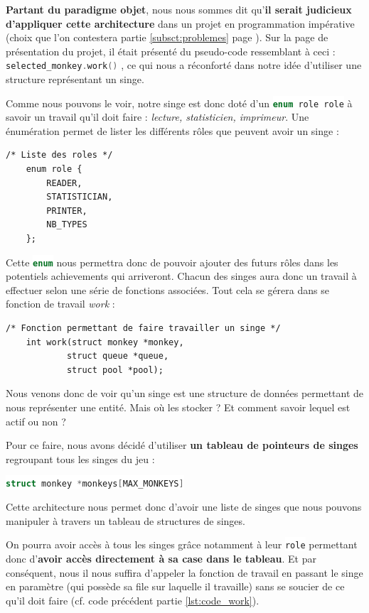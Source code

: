 \documentclass{article}
\newcommand{\inlinecode}[2]{\colorbox{white}{\lstinline[language=#1]$#2$}}
\begin{document}
\textbf{Partant du paradigme objet}, nous nous sommes dit qu'\textbf{il serait judicieux d'appliquer cette architecture} dans un projet en programmation impérative (choix que l'on contestera partie \ref{subsct:problemes} page \pageref{subsct:problemes}). Sur la page de présentation du projet, il était présenté du pseudo-code ressemblant à ceci : \inlinecode{C++}{selected_monkey.work()} \label{lst:work_method_poo}, ce qui nous a réconforté dans notre idée d'utiliser une structure représentant un singe.

Comme nous pouvons le voir, notre singe est donc doté d'un \inlinecode{C}{enum role role} à savoir un travail qu'il doit faire : \textit{lecture, statisticien, imprimeur}. Une énumération permet de lister les différents rôles que peuvent avoir un singe :
\begin{lstlisting}
/* Liste des roles */
    enum role {
        READER,
        STATISTICIAN,
        PRINTER,
        NB_TYPES
    }; 
\end{lstlisting}
\label{lst:enum_role}

Cette \inlinecode{C}{enum} nous permettra donc de pouvoir ajouter des futurs rôles dans les potentiels achievements qui arriveront. Chacun des singes aura donc un travail à effectuer selon une série de fonctions associées. Tout cela se gérera dans se fonction de travail \textit{work} :
\begin{lstlisting}
/* Fonction permettant de faire travailler un singe */
    int work(struct monkey *monkey,
            struct queue *queue,
            struct pool *pool);
\end{lstlisting}
\label{lst:code_work}

Nous venons donc de voir qu'un singe est une structure de données permettant de nous représenter une entité. Mais où les stocker ? Et comment savoir lequel est actif ou non ?

Pour ce faire, nous avons décidé d'utiliser \textbf{un tableau de pointeurs de singes} regroupant tous les singes du jeu :

\inlinecode{C}{struct monkey *monkeys[MAX_MONKEYS]}

Cette architecture nous permet donc d'avoir une liste de singes que nous pouvons manipuler à travers un tableau de structures de singes.

On pourra avoir accès à tous les singes grâce notamment à leur \inlinecode{C}{role} permettant donc d'\textbf{avoir accès directement à sa case dans le tableau}. Et par conséquent, nous il nous suffira d'appeler la fonction de travail en passant le singe en paramètre (qui possède sa file sur laquelle il travaille) sans se soucier de ce qu'il doit faire (cf. code précédent partie \ref{lst:code_work}).
\end{document}
